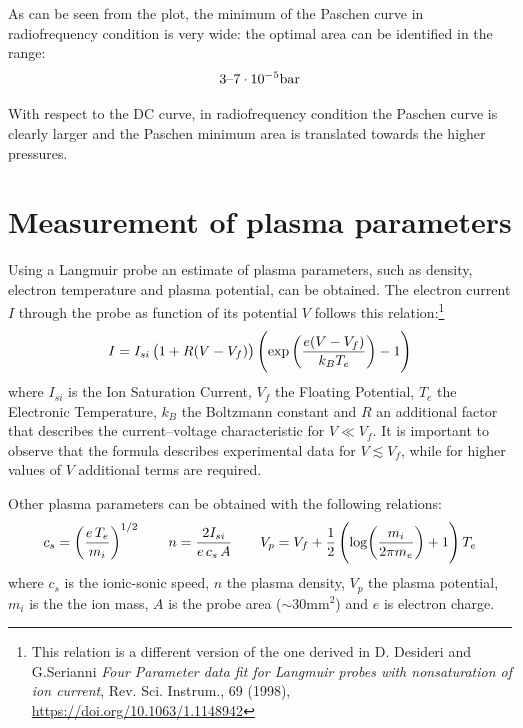 \documentclass[11pt,a4 paper]{article}
\let\oldfrac\frac
\renewcommand{\frac}[3][d]{\ifthenelse{\equal{#1}{d}}{\oldfrac{#2}{#3}}{\nicefrac{#2}{#3}}}
\begin{document}

As can be seen from the plot, the minimum of the Paschen curve in radiofrequency condition is very wide: the optimal area can be identified in the range: $$3\textup{--}7 \cdot 10^{-5}\si{\bar}$$

With respect to the DC curve, in radiofrequency condition the Paschen curve is clearly larger and the Paschen minimum area is translated towards the higher pressures.

\section{Measurement of plasma parameters}
Using a Langmuir probe an estimate of plasma parameters, such as density, electron temperature and plasma potential, can be obtained.
The electron current $I$ through the probe as function of its potential $V$ follows this relation:\footnote{This relation is a different version of the one derived in D. Desideri and G.Serianni \emph{Four Parameter data fit for Langmuir probes with nonsaturation of ion current}, Rev. Sci. Instrum., 69 (1998), \url{https://doi.org/10.1063/1.1148942}}
\[I=I_{si}\left(1+R(V-V_f)\right)\left(\exp\left(\frac{e(V-V_f)}{k_BT_e}\right)-1\right)\]
where $I_{si}$ is the Ion Saturation Current, $V_f$ the Floating Potential, $T_e$ the Electronic Temperature, $k_B$ the Boltzmann constant and $R$ an additional factor that describes the current--voltage characteristic for $V\ll V_f$.
It is important to observe that the formula describes experimental data for $V\lesssim V_f$, while for higher values of $V$ additional terms are required.

Other plasma parameters can be obtained with the following relations:
\begin{equation*}
  c_s=\left(\frac{e\,T_e}{m_i}\right)^{1/2} \qquad
  n=\frac{2I_{si}}{e\,c_s\,A} \qquad
  V_p=V_f+\frac12\left(\log(\frac{m_i}{2\pi m_e})+1\right) T_e
\end{equation*}
where $c_s$ is the ionic-sonic speed, $n$ the plasma density, $V_p$ the plasma potential, $m_i$ is the the ion mass, $A$ is the probe area ($\sim30\si{\milli\metre}^2$) and $e$ is electron charge.
\end{document}
